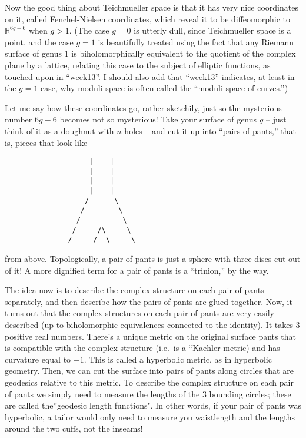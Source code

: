 \documentclass{article}
\begin{document}
Now the good thing about Teichmueller space is that it has very nice
coordinates on it, called Fenchel-Nielsen coordinates, which reveal it
to be diffeomorphic to \(\mathbb{R}^{6g-6}\) when \(g > 1\). (The case
\(g = 0\) is utterly dull, since Teichmueller space is a point, and the
case \(g = 1\) is beautifully treated using the fact that any Riemann
surface of genus 1 is biholomorphically equivalent to the quotient of
the complex plane by a lattice, relating this case to the subject of
elliptic functions, as touched upon in ``week13''. I should also add
that ``week13'' indicates, at least in the \(g = 1\) case, why moduli
space is often called the ``moduli space of curves.'')

Let me say how these coordinates go, rather sketchily, just so the
mysterious number \(6g-6\) becomes not so mysterious! Take your surface
of genus \(g\) -- just think of it as a doughnut with \(n\) holes -- and
cut it up into ``pairs of pants,'' that is, pieces that look like

\begin{verbatim}
                    |    |
                    |    |
                    |    |
                    |    |
                   /      \
                  /        \
                 /          \
                /     /\     \
               /     /  \     \
\end{verbatim}

from above. Topologically, a pair of pants is just a sphere with three
discs cut out of it! A more dignified term for a pair of pants is a
``trinion,'' by the way.

The idea now is to describe the complex structure on each pair of pants
separately, and then describe how the pairs of pants are glued together.
Now, it turns out that the complex structures on each pair of pants are
very easily described (up to biholomorphic equivalences connected to the
identity). It takes 3 positive real numbers. There's a unique metric on
the original surface pants that is compatible with the complex structure
(i.e.~is a ``Kaehler metric) and has curvature equal to \(-1\). This is
called a hyperbolic metric, as in hyperbolic geometry. Then, we can cut
the surface into pairs of pants along circles that are geodesics
relative to this metric. To describe the complex structure on each pair
of pants we simply need to measure the lengths of the 3 bounding
circles; these are called the''geodesic length functions". In other
words, if your pair of pants was hyperbolic, a tailor would only need to
measure you waistlength and the lengths around the two cuffs, not the
inseams!
\end{document}
